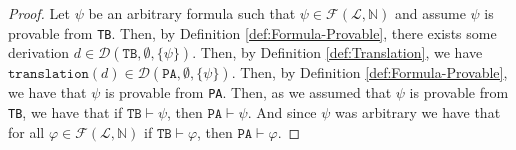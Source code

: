 \begin{proof}
    \leanok
    Let $\psi$ be an arbitrary formula such that $\psi \in \mathcal{F}(\mathcal{L},\mathbb{N})$ and assume $\psi$ is provable from \texttt{TB}. Then, by Definition \ref{def:Formula-Provable}, there exists some derivation $d \in \mathcal{D}(\texttt{TB},\emptyset,\{\psi\})$. Then, by Definition \ref{def:Translation}, we have $\texttt{translation}(d) \in \mathcal{D}(\texttt{PA},\emptyset,\{\psi\})$. Then, by Definition \ref{def:Formula-Provable}, we have that $\psi$ is provable from \texttt{PA}. Then, as we assumed that $\psi$ is provable from \texttt{TB}, we have that if $\texttt{TB} \vdash \psi$, then $\texttt{PA} \vdash \psi$. And since $\psi$ was arbitrary we have that for all $\varphi \in \mathcal{F}(\mathcal{L}, \mathbb{N})$ if $\texttt{TB} \vdash \varphi$, then $\texttt{PA} \vdash \varphi$.
\end{proof}





%










